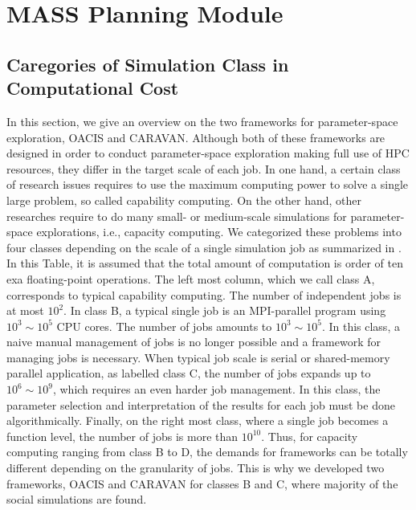 \section{MASS Planning Module}
\label{s:MASS Planning Module}

\subsection{Caregories of Simulation Class in Computational Cost}


In this section, we give an overview on the two frameworks for parameter-space exploration, OACIS and CARAVAN.
Although both of these frameworks are designed in order to conduct parameter-space exploration making full use of HPC resources, they differ in the target scale of each job.
In one hand, a certain class of research issues requires to use the maximum computing power to solve a single large problem, so called capability computing.
On the other hand, other researches require to do many small- or medium-scale simulations for parameter-space explorations, i.e., capacity computing.
We categorized these problems into four classes depending on the scale of a single simulation job as summarized in .
In this Table, it is assumed that the total amount of computation is order of ten exa floating-point operations.
The left most column, which we call class A, corresponds to typical capability computing. The number of independent jobs is at most $10^2$.
In class B, a typical single job is an MPI-parallel program using $10^3 \sim 10^5$ CPU cores. The number of jobs amounts to $10^3 \sim 10^5$.
In this class, a naive manual management of jobs is no longer possible and a framework for managing jobs is necessary.
When typical job scale is serial or shared-memory parallel application, as labelled class C, the number of jobs expands up to $10^6 \sim 10^9$, which requires an even harder job management.
In this class, the parameter selection and interpretation of the results for each job must be done algorithmically.
Finally, on the right most class, where a single job becomes a function level, the number of jobs is more than $10^{10}$.
Thus, for capacity computing ranging from class B to D, the demands for frameworks can be totally different depending on the granularity of jobs.
This is why we developed two frameworks, OACIS and CARAVAN for classes B and C, where majority of the social simulations are found.

